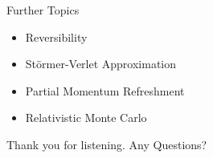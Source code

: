 \documentclass{beamer}
\begin{document}


\begin{frame}{Further Topics}

\begin{itemize}

\item Reversibility 

\item Störmer-Verlet Approximation 

\item Partial Momentum Refreshment

\item Relativistic Monte Carlo

\end{itemize}

\begin{center}
Thank you for listening.
\vskip 0.5cm
Any Questions?

\end{center}


\end{frame}
\end{document}
